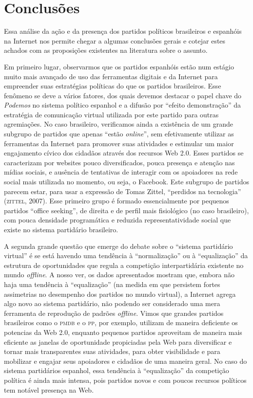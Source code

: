 \section{Conclusões}

Essa análise da ação e da presença dos partidos políticos brasileiros e
espanhóis na Internet nos permite chegar a algumas conclusões gerais e
cotejar estes achados com as proposições existentes na literatura sobre
o assunto.

Em primeiro lugar, observarmos que os partidos espanhóis estão num
estágio muito mais avançado de uso das ferramentas digitais e da
Internet para empreender suas estratégias políticas do que os partidos
brasileiros. Esse fenômeno se deve a vários fatores, dos quais devemos
destacar o papel chave do \emph{Podemos} no sistema político espanhol e
a difusão por ``efeito demonstração'' da estratégia de comunicação
virtual utilizada por este partido para outras agremiações. No caso
brasileiro, verificamos ainda a existência de um grande subgrupo de
partidos que apenas ``estão \emph{online}'', sem efetivamente utilizar as
ferramentas da Internet para promover suas atividades e estimular um
maior engajamento cívico dos cidadãos através dos recursos Web 2.0.
Esses partidos se caracterizam por websites pouco diversificados, pouca
presença e atenção nas mídias sociais, e ausência de tentativas de
interagir com os apoiadores na rede social mais utilizada no momento, ou
seja, o Facebook. Este subgrupo de partidos parecem estar, para usar a
expressão de Tomas Zittel, ``perdidos na tecnologia'' (\textsc{zittel}, 2007).
Esse primeiro grupo é formado essencialmente por pequenos partidos
``office seeking'', de direita e de perfil mais fisiológico (no caso
brasileiro), com pouca densidade programática e reduzida
representatividade social que existe no sistema partidário brasileiro.

A segunda grande questão que emerge do debate sobre o ``sistema
partidário virtual'' é se está havendo uma tendência à ``normalização''
ou à ``equalização'' da estrutura de oportunidades que regula a
competição interpartidária existente no mundo \emph{offline}. A nosso ver, os
dados apresentados mostram que, embora não haja uma tendência à
``equalização'' (na medida em que persistem fortes assimetrias no
desempenho dos partidos no mundo virtual), a Internet agrega algo novo
ao sistema partidário, não podendo ser considerado uma mera ferramenta
de reprodução de padrões \emph{offline}. Vimos que grandes partidos
brasileiros como o \textsc{pmdb} e o \textsc{pp}, por exemplo, utilizam de maneira
deficiente os potencias da Web 2.0, enquanto pequenos partidos
aproveitam de maneira mais eficiente as janelas de oportunidade
propiciadas pela Web para diversificar e tornar mais transparentes suas
atividades, para obter visibilidade e para mobilizar e engajar seus
apoiadores e cidadãos de uma maneira geral. No caso do sistema
partidários espanhol, essa tendência à ``equalização'' da competição
política é ainda mais intensa, pois partidos novos e com poucos recursos
políticos tem notável presença na Web.

